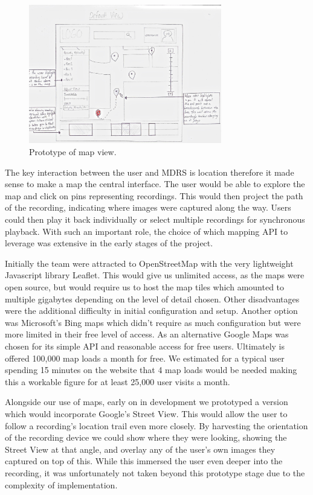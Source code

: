 \documentclass{l3proj}
\begin{document}
\begin{figure}[ht!]
\centering
\includegraphics[width=0.75\textwidth]{images/web-map-view.jpg}
\caption{Prototype of map view.}
\end{figure}

The key interaction between the user and MDRS is location therefore it made sense to make a map the central interface. The user would be able to explore the map and click on pins representing recordings. This would then project the path of the recording, indicating where images were captured along the way. Users could then play it back individually or select multiple recordings for synchronous playback. With such an important role, the choice of which mapping API to leverage was extensive in the early stages of the project.

Initially the team were attracted to OpenStreetMap with the very lightweight Javascript library Leaflet. This would give us unlimited access, as the maps were open source, but would require us to host the map tiles which amounted to multiple gigabytes depending on the level of detail chosen. Other disadvantages were the additional difficulty in initial configuration and setup. Another option was Microsoft’s Bing maps which didn't require as much configuration but were more limited in their free level of access. As an alternative Google Maps was chosen for its simple API and reasonable access for free users. Ultimately is offered 100,000 map loads a month for free. We estimated for a typical user spending 15 minutes on the website that 4 map loads would be needed making this a workable figure for at least 25,000 user visits a month.

Alongside our use of maps, early on in development we prototyped a version which would incorporate Google's Street View. This would allow the user to follow a recording's location trail even more closely. By harvesting the orientation of the recording device we could show where they were looking, showing the Street View at that angle, and overlay any of the user's own images they captured on top of this. While this immersed the user even deeper into the recording, it was unfortunately not taken beyond this prototype stage due to the complexity of implementation.
\end{document}
